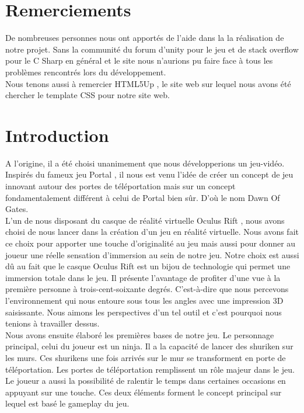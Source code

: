\documentclass[12pt]{article}
\begin{document}
\newpage

\section*{Remerciements}

De nombreuses personnes nous ont apportés de l'aide dans la la réalisation de notre projet. Sans la communité du forum d'unity \cite{unityforum} pour le jeu et de stack overflow \cite{stackoverflow} pour le C Sharp en général et le site nous n'aurions pu faire face à tous les problèmes rencontrés lors du développement.\\
Nous tenons aussi à remercier HTML5Up \cite{html5up}, le site web sur lequel nous avons été chercher le \gls{template} \gls{CSS} pour notre site web.

\newpage

\section*{Introduction}

A l'origine, il a été choisi unanimement que nous développerions un jeu-vidéo. Inspirés du fameux jeu Portal \cite{portal}, il nous est venu l'idée de créer un concept de jeu innovant autour des portes de téléportation mais sur un concept fondamentalement différent à celui de Portal bien sûr. D'où le nom Dawn Of Gates.\\
L'un de nous disposant du casque de réalité virtuelle Oculus Rift \cite{oculus}, nous avons choisi de nous lancer dans la création d'un jeu en réalité virtuelle. Nous avons fait ce choix pour apporter une touche d'originalité au jeu mais aussi pour donner au joueur une réelle sensation d'immersion au sein de notre jeu. Notre choix est aussi dû au fait que le casque Oculus Rift est un bijou de technologie qui permet une immersion totale dans le jeu. Il présente l'avantage de profiter d'une vue à la première personne à trois-cent-soixante degrés. C'est-à-dire que nous percevons l'environnement qui nous entoure sous tous les angles avec une impression 3D saisissante. Nous aimons les perspectives d'un tel outil et c'est pourquoi nous tenions à travailler dessus.\\
Nous avons ensuite élaboré les premières bases de notre jeu. Le personnage principal, celui du joueur est un ninja. Il a la capacité de lancer des \gls{shuriken} sur les murs. Ces shurikens une fois arrivés sur le mur se transforment en porte de téléportation. Les portes de téléportation remplissent un rôle majeur dans le jeu. Le joueur a aussi la possibilité de ralentir le temps dans certaines occasions en appuyant sur une touche. Ces deux éléments forment le concept principal sur lequel est basé le gameplay du jeu.\\
\end{document}
